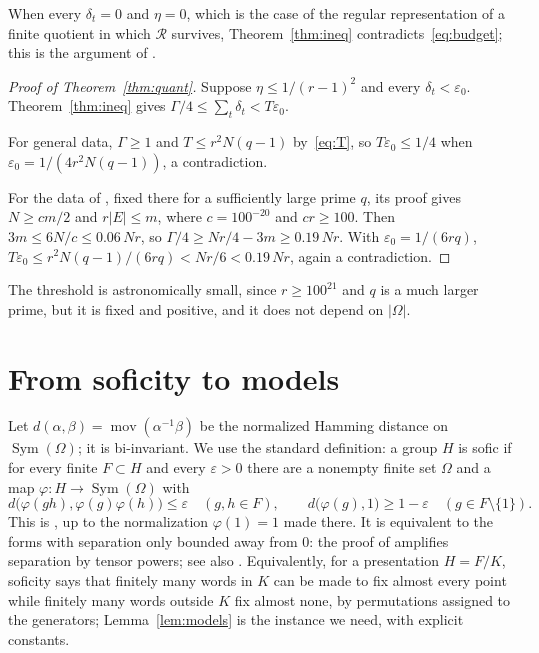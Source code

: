 \documentclass[11pt]{article}
\theoremstyle{definition}
\theoremstyle{remark}
\numberwithin{equation}{section}
\DeclareMathOperator{\Sym}{Sym}
\DeclareMathOperator{\mov}{mov}
\newcommand{\eps}{\varepsilon}
\newcommand{\cR}{\mathcal R}
\begin{document}
When every $\delta_t=0$ and $\eta=0$, which is the case of the regular representation of a finite quotient in which $\cR$ survives, Theorem~\ref{thm:ineq} contradicts~\eqref{eq:budget}; this is the argument of \cite[Section~2]{OAI252}.

\begin{proof}[Proof of Theorem~\ref{thm:quant}]
Suppose $\eta\le1/(r-1)^2$ and every $\delta_t<\eps_0$. Theorem~\ref{thm:ineq} gives $\Gamma/4\le\sum_t\delta_t<T\eps_0$.

For general data, $\Gamma\ge1$ and $T\le r^2N(q-1)$ by~\eqref{eq:T}, so $T\eps_0\le1/4$ when $\eps_0=1/(4r^2N(q-1))$, a contradiction.

For the data of \cite[Lemma~2.2]{OAI252}, fixed there for a sufficiently large prime $q$, its proof gives $N\ge cm/2$ and $r|E|\le m$, where $c=100^{-20}$ and $cr\ge100$. Then $3m\le6N/c\le0.06\,Nr$, so $\Gamma/4\ge Nr/4-3m\ge0.19\,Nr$. With $\eps_0=1/(6rq)$, $T\eps_0\le r^2N(q-1)/(6rq)<Nr/6<0.19\,Nr$, again a contradiction.
\end{proof}

The threshold is astronomically small, since $r\ge100^{21}$ and $q$ is a much larger prime, but it is fixed and positive, and it does not depend on $|\Omega|$.

\section{From soficity to models}\label{sec:sofic}

Let $d(\alpha,\beta)=\mov(\alpha^{-1}\beta)$ be the normalized Hamming distance on $\Sym(\Omega)$; it is bi-invariant. We use the standard definition: a group $H$ is sofic if for every finite $F\subset H$ and every $\eps>0$ there are a nonempty finite set $\Omega$ and a map $\varphi:H\to\Sym(\Omega)$ with
\[
 d\bigl(\varphi(gh),\varphi(g)\varphi(h)\bigr)\le\eps\quad(g,h\in F),\qquad d\bigl(\varphi(g),1\bigr)\ge1-\eps\quad(g\in F\setminus\{1\}).
\]
This is \cite[Definition~1.2]{ElekSzabo2005}, up to the normalization $\varphi(1)=1$ made there. It is equivalent to the forms with separation only bounded away from $0$: the proof of \cite[Theorem~1]{ElekSzabo2005} amplifies separation by tensor powers; see also \cite[Theorem~3.5 and its proof]{Pestov2008}. Equivalently, for a presentation $H=F/K$, soficity says that finitely many words in $K$ can be made to fix almost every point while finitely many words outside $K$ fix almost none, by permutations assigned to the generators; Lemma~\ref{lem:models} is the instance we need, with explicit constants.
\end{document}
